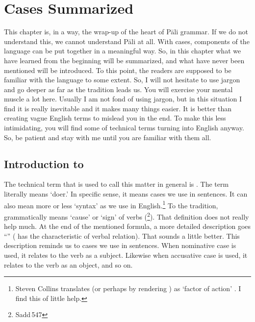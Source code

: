 \chapter{Cases Summarized}\label{chap:cases}

This chapter is, in a way, the wrap-up of the heart of P\=ali grammar. If we do not understand this, we cannot understand P\=ali at all. With cases, components of the language can be put together in a meaningful way. So, in this chapter what we have learned from the beginning will be summarized, and what have never been mentioned will be introduced. To this point, the readers are supposed to be familiar with the language to some extent. So, I will not hesitate to use jargon and go deeper as far as the tradition leads us. You will exercise your mental muscle a lot here. Usually I am not fond of using jargon, but in this situation I find it is really inevitable and it makes many things easier. It is better than creating vague English terms to mislead you in the end. To make this less intimidating, you will find some of technical terms turning into English anyway. So, be patient and stay with me until you are familiar with them all.

{}
\section*{Introduction to }

The technical term that is used to call this matter in general is . The term literally means `doer.' In specific sense, it means cases we use in sentences. It can also mean more or less `syntax' as we use in English.\footnote{Steven Collins translates  (or perhaps by rendering ) as `factor of action' \citep[p.~42]{collins:grammar}. I find this of little help.} To the tradition, grammatically  means `cause' or `sign' of verbs (\footnote{Sadd\,547}). That definition does not really help much. At the end of the mentioned formula, a more detailed description goes ``'' ( has the characteristic of verbal relation). That sounds a little better. This description reminds us to cases we use in sentences. When nominative case is used, it relates to the verb as a subject. Likewise when accusative case is used, it relates to the verb as an object, and so on.

